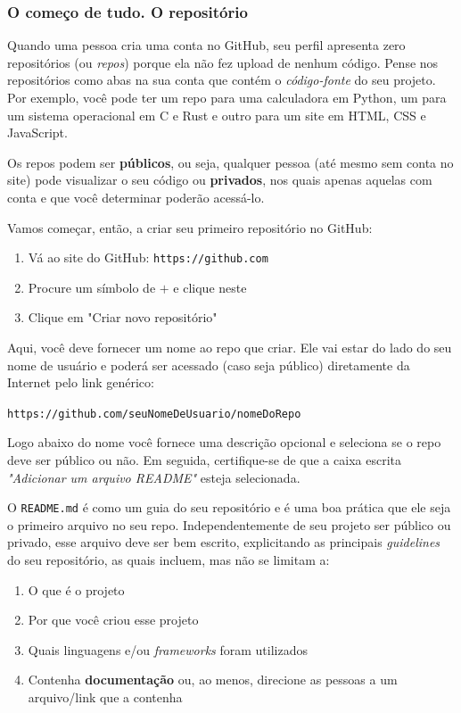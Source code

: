 \documentclass{article}
\begin{document}
	\subsubsection{O começo de tudo. O repositório}

	Quando uma pessoa cria uma conta no GitHub, seu perfil apresenta zero repositórios (ou \textit{repos}) porque ela não fez upload de nenhum 
	código. Pense nos repositórios como abas na sua conta que contém o \textit{código-fonte} do seu projeto. Por exemplo, 
	você pode ter um repo para uma calculadora em Python, um para um sistema operacional em C e Rust e outro para um site em 
	HTML, CSS e JavaScript. 

	Os repos podem ser \textbf{públicos}, ou seja, qualquer pessoa (até mesmo sem conta no site) pode visualizar o seu código ou 
	\textbf{privados}, nos quais apenas aquelas com conta e que você determinar poderão acessá-lo. 

	Vamos começar, então, a criar seu primeiro repositório no GitHub: 
	\begin{enumerate} 
		\item{Vá ao site do GitHub: \texttt{https://github.com}}
		\item{Procure um símbolo de $ + $ e clique neste}
		\item{Clique em "Criar novo repositório"}
	\end{enumerate}

	Aqui, você deve fornecer um nome ao repo que criar. Ele vai estar do lado do seu nome de usuário e poderá ser acessado 
	(caso seja público) diretamente da Internet pelo link genérico: 
	
	\vspace{1ex}
	\texttt{https://github.com/seuNomeDeUsuario/nomeDoRepo}
	\vspace{1ex}

	Logo abaixo do nome você fornece uma descrição opcional e seleciona se o repo deve ser público ou não. 
	Em seguida, certifique-se de que a caixa escrita \textit{"Adicionar um arquivo README"} esteja selecionada. 
	
	
	O \texttt{README.md} é como um guia do seu repositório e é uma boa prática que ele seja o primeiro arquivo no seu repo. 
	Independentemente de seu projeto ser público ou privado, esse arquivo deve ser bem escrito, explicitando as principais 
	\textit{guidelines} do seu repositório, as quais incluem, mas não se limitam a: 

	\begin{enumerate}
		\item{O que é o projeto}
		\item{Por que você criou esse projeto}
		\item{Quais linguagens e/ou \textit{frameworks} foram utilizados}
		\item{Contenha \textbf{documentação} ou, ao menos, direcione as pessoas a um arquivo/link que a contenha}
	\end{enumerate}
\end{document}

